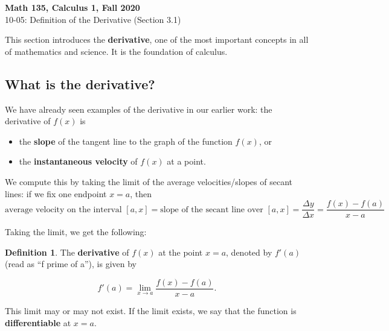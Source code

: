 \documentclass[11pt,reqno,final]{amsart}
\numberwithin{figure}{section}
\theoremstyle{definition} %
\newtheorem*{definition*}{Definition}%
\newcommand{\dlim}{\displaystyle\lim}
\begin{document}
\onehalfspacing

\begin{center}
        \textbf{\Large Math 135, Calculus 1, Fall 2020}\\[10pt]
        {\large 10-05: Definition of the Derivative (Section 3.1)}
\end{center}

\thispagestyle{empty}

\renewcommand{\thesection}{\Alph{section}}


This section introduces the \textbf{derivative}, one of the most important concepts in all of mathematics and science.  
It is the foundation of calculus.  

\subsection*{What is the derivative?}

We have already seen examples of the derivative in our earlier work:
the derivative of $f(x)$ is
\begin{itemize}
\item the \textbf{slope} of the tangent line to the graph of the function $f(x)$, or
\item the \textbf{instantaneous velocity} of $f(x)$ at a point.
\end{itemize}

We compute this by taking the limit of the average velocities/slopes of secant lines:
if we fix one endpoint $x = a$, then 
\[
        \mbox{average velocity on the interval $[a,x]$} = \mbox{slope of the secant line over $[a,x]$}
        = \dfrac{\Delta y}{\Delta x}
        = \dfrac{f(x) - f(a)}{x-a}        
\]

Taking the limit, we get the following:
\begin{definition*}
        The \textbf{derivative} of $f(x)$ at the point $x = a$, denoted by $f'(a)$ (read as ``f prime of a''), is given by
        \begin{framed}
                \begin{equation}
                        \label{DEFDER_EQ}
                        f'(a) = \dlim_{x \to a}\dfrac{f(x) - f(a)}{x-a}.
                \end{equation}
        \end{framed}
        \renewcommand{\arraystretch}{0.5}
        This limit may or may not exist.  If the limit exists, we say that
        the function is {\bf differentiable} at $x = a$.       
\end{definition*}
\end{document}

